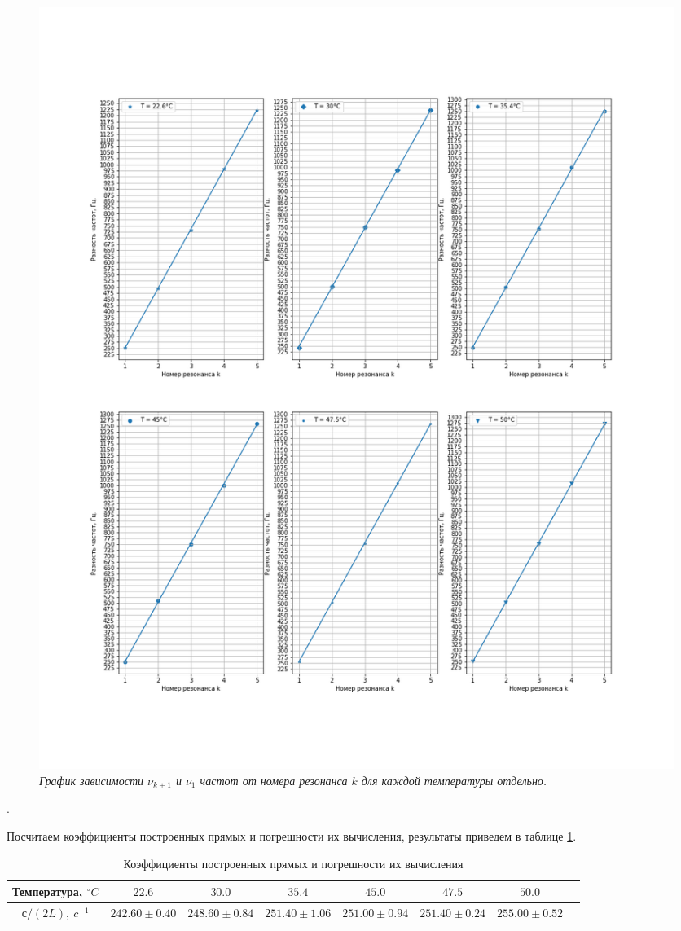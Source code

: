 \documentclass[a4paper, 12pt]{article}
\newcounter{Points}
\newcommand{\point}{\arabic{Points}. \addtocounter{Points}{1}}
\begin{document}
\begin{figure}[hb]
    \centering
    \includegraphics[width=\linewidth]{freqs_to_resonances_in_diff_plots.png}
    \caption{\textit{График зависимости $\nu_{k + 1}$ и $\nu_1$ частот от номера резонанса $k$ для каждой температуры отдельно.}}
    \label{fig:freqs_to_resonances_in_diff_plots}
\end{figure}

\point Посчитаем коэффициенты построенных прямых и погрешности их вычисления, результаты приведем в таблице \ref{tabl:line_coefs}.


\begin{table}[h]
    \centering
    \small
    \setlength\tabcolsep{3pt}

    \begin{tabular}{|c|c|c|c|c|c|c|c|}
    \hline 
    Температура, $^\circ C$ & $22.6$ & $30.0$ & $35.4$ & $45.0$ & $47.5$ & $50.0$ \\ \hline

    $с / \left(2 L\right),~ c^{-1}$ & $242.60 \pm 0.40$ & $248.60 \pm 0.84$ & $251.40 \pm 1.06$ & $251.00 \pm 0.94$ & $251.40 \pm 0.24$ & $255.00 \pm 0.52$ \\ \hline
    \end{tabular}
	\caption{Коэффициенты построенных прямых и погрешности их вычисления}
    \label{tabl:line_coefs}
\end{table}
\end{document}
